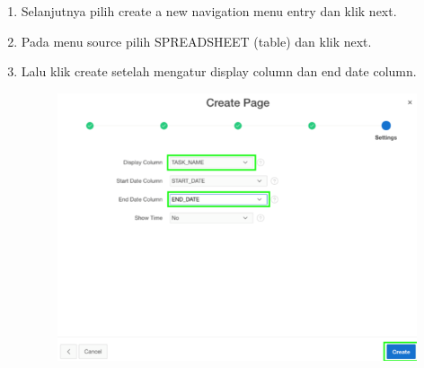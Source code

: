 \begin{enumerate}
    \item{Selanjutnya pilih create a new navigation menu entry dan klik next.}
    \item{Pada menu source pilih SPREADSHEET (table) dan klik next.}
    \item{Lalu klik create setelah mengatur display column dan end date column.}
    
\begin{figure}[!htbp]
    \centering
    \includegraphics[scale=0.5]{section/gambar_bab2/kalender6.png}
    \label{penanda}
\end{figure}
\end{enumerate}

